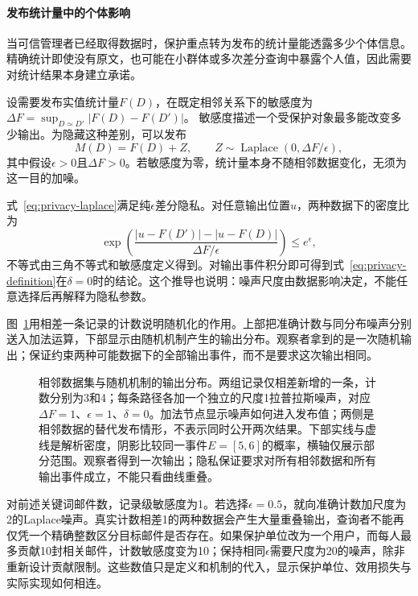 \paragraph{发布统计量中的个体影响}

当可信管理者已经取得数据时，保护重点转为发布的统计量能透露多少个体信息。精确统计即使没有原文，也可能在小群体或多次差分查询中暴露个人值，因此需要对统计结果本身建立承诺。

设需要发布实值统计量$F(D)$，在既定相邻关系下的敏感度为
$\Delta F=\sup_{D\simeq D'}|F(D)-F(D')|$。
敏感度描述一个受保护对象最多能改变多少输出。为隐藏这种差别，可以发布
\begin{equation}
 M(D)=F(D)+Z,\qquad
 Z\sim\operatorname{Laplace}(0,\Delta F/\epsilon),
 \label{eq:privacy-laplace}
\end{equation}
其中假设$\epsilon>0$且$\Delta F>0$。若敏感度为零，统计量本身不随相邻数据变化，无须为这一目的加噪。

式~\eqref{eq:privacy-laplace}满足纯$\epsilon$差分隐私。对任意输出位置$u$，两种数据下的密度比为
\[
 \exp\left(
 \frac{|u-F(D')|-|u-F(D)|}{\Delta F/\epsilon}
 \right)\leq e^\epsilon,
\]
不等式由三角不等式和敏感度定义得到。对输出事件积分即可得到式~\eqref{eq:privacy-definition}在$\delta=0$时的结论。这个推导也说明：噪声尺度由数据影响决定，不能任意选择后再解释为隐私参数。

图~\ref{fig:trust-dp-neighbors}用相差一条记录的计数说明随机化的作用。上部把准确计数与同分布噪声分别送入加法运算，下部显示由随机机制产生的输出分布。观察者拿到的是一次随机输出；保证约束两种可能数据下的全部输出事件，而不是要求这次输出相同。

\begin{figure}[!htb]
  \centering
  
  \caption{相邻数据集与随机机制的输出分布。两组记录仅相差新增的一条，计数分别为3和4；每条路径各加一个独立的尺度1拉普拉斯噪声，对应$\Delta F=1$、$\epsilon=1$、$\delta=0$。加法节点显示噪声如何进入发布值；两侧是相邻数据的替代发布情形，不表示同时公开两次结果。下部实线与虚线是解析密度，阴影比较同一事件$E=[5,6]$的概率，横轴仅展示部分范围。观察者得到一次输出；隐私保证要求对所有相邻数据和所有输出事件成立，不能只看曲线重叠。}
  \label{fig:trust-dp-neighbors}
\end{figure}

对前述关键词邮件数，记录级敏感度为1。若选择$\epsilon=0.5$，就向准确计数加尺度为2的Laplace噪声。真实计数相差1的两种数据会产生大量重叠输出，查询者不能再仅凭一个精确整数区分目标邮件是否存在。如果保护单位改为一个用户，而每人最多贡献10封相关邮件，计数敏感度变为10；保持相同$\epsilon$需要尺度为20的噪声，除非重新设计贡献限制。这些数值只是定义和机制的代入，显示保护单位、效用损失与实际实现如何相连。

